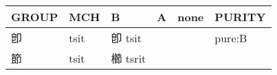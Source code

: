 \documentclass[14pt,a4paper]{scrartcl}
\begin{document}
\begin{longtable}[c]{@{}llllll@{}}
\toprule
\begin{minipage}[b]{0.14\columnwidth}\raggedright\strut
GROUP
\strut\end{minipage} &
\begin{minipage}[b]{0.14\columnwidth}\raggedright\strut
MCH
\strut\end{minipage} &
\begin{minipage}[b]{0.14\columnwidth}\raggedright\strut
B
\strut\end{minipage} &
\begin{minipage}[b]{0.14\columnwidth}\raggedright\strut
A
\strut\end{minipage} &
\begin{minipage}[b]{0.14\columnwidth}\raggedright\strut
none
\strut\end{minipage} &
\begin{minipage}[b]{0.14\columnwidth}\raggedright\strut
PURITY
\strut\end{minipage}\tabularnewline
\midrule
\endhead
\begin{minipage}[t]{0.14\columnwidth}\raggedright\strut
卽
\strut\end{minipage} &
\begin{minipage}[t]{0.14\columnwidth}\raggedright\strut
tsit
\strut\end{minipage} &
\begin{minipage}[t]{0.14\columnwidth}\raggedright\strut
卽 tsit
\strut\end{minipage} &
\begin{minipage}[t]{0.14\columnwidth}\raggedright\strut
\strut\end{minipage} &
\begin{minipage}[t]{0.14\columnwidth}\raggedright\strut
\strut\end{minipage} &
\begin{minipage}[t]{0.14\columnwidth}\raggedright\strut
pure:B
\strut\end{minipage}\tabularnewline
\begin{minipage}[t]{0.14\columnwidth}\raggedright\strut
節
\strut\end{minipage} &
\begin{minipage}[t]{0.14\columnwidth}\raggedright\strut
tsit
\strut\end{minipage} &
\begin{minipage}[t]{0.14\columnwidth}\raggedright\strut
櫛 tsrit
\strut\end{minipage} &
\begin{minipage}[t]{0.14\columnwidth}\raggedright\strut

\end{minipage}
\end{longtable}
\end{document}
